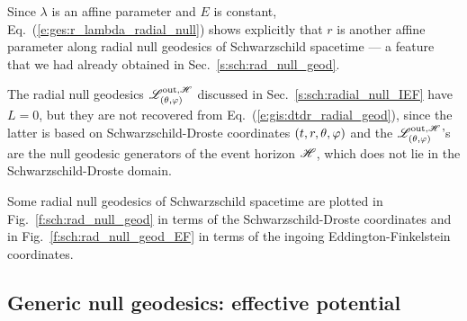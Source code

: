 \begin{remark}
Since $\lambda$ is an affine parameter and $E$ is constant,
Eq.~(\ref{e:ges:r_lambda_radial_null})
shows explicitly that $r$ is another affine parameter along radial null
geodesics of Schwarzschild spacetime --- a feature that we had already
obtained in Sec.~\ref{s:sch:rad_null_geod}.
\end{remark}

\begin{remark}
The radial null geodesics $\mathscr{L}^{{\rm out},\mathscr{H}}_{(\theta,\varphi)}$ discussed
in Sec.~\ref{s:sch:radial_null_IEF} have $L=0$, but they
are not recovered from Eq.~(\ref{e:gis:dtdr_radial_geod}), since the latter is based on Schwarzschild-Droste coordinates
$(t,r,\theta,\varphi)$ and the $\mathscr{L}^{{\rm out},\mathscr{H}}_{(\theta,\varphi)}$'s are the null geodesic generators
of the event horizon $\mathscr{H}$, which does not lie in the Schwarzschild-Droste domain.
\end{remark}

Some radial null geodesics of Schwarzschild spacetime are plotted in
Fig.~\ref{f:sch:rad_null_geod} in terms of the Schwarzschild-Droste coordinates
and in Fig.~\ref{f:sch:rad_null_geod_EF} in terms of the ingoing Eddington-Finkelstein coordinates.



\subsection{Generic null geodesics: effective potential}
\label{s:gis:null_eff_pot}

